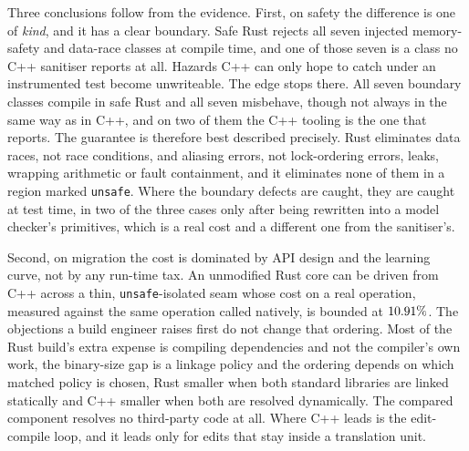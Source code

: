 \documentclass[english,oneside,a4paper,censored,csm,software-track-2020]{HYthesisML}
\begin{document}
Three conclusions follow from the evidence. First, on safety the difference is one of
\emph{kind}, and it has a clear boundary. Safe Rust rejects all seven injected memory-safety and
data-race classes at compile time, and one of those seven is a class no C++ sanitiser reports at
all. Hazards C++ can only hope to catch under an instrumented test become unwriteable. The edge
stops there.
All seven boundary
classes compile in safe Rust and all seven misbehave, though not always in the same way as in C++,
and on two of them the C++
tooling is the one that reports. The guarantee is therefore best described precisely. Rust
eliminates data races, not race conditions, and aliasing errors, not lock-ordering errors,
leaks, wrapping arithmetic or fault containment, and it eliminates none of them in a region
marked \texttt{unsafe}. Where the boundary defects are caught, they are
caught at test time, in two of the three cases only after being rewritten into a model checker's
primitives, which is a real cost and a different one from the sanitiser's.

Second, on migration
the cost is dominated by API design and the learning curve, not by any run-time tax. An
unmodified Rust core can be driven from C++ across a thin, \texttt{unsafe}-isolated seam whose
cost on a real operation, measured against the same operation called natively, is bounded at
$10.91\%$. The objections a build engineer raises first do not change that ordering.
Most of the Rust build's extra expense is compiling dependencies and not the compiler's own work,
the binary-size gap is a linkage policy and the ordering depends on which matched policy is chosen,
Rust smaller when both standard libraries are linked statically and C++ smaller when both are
resolved dynamically. The compared
component resolves no third-party code at all. Where C++ leads is the edit-compile loop, and it
leads only for edits that stay inside a translation unit.
\end{document}
